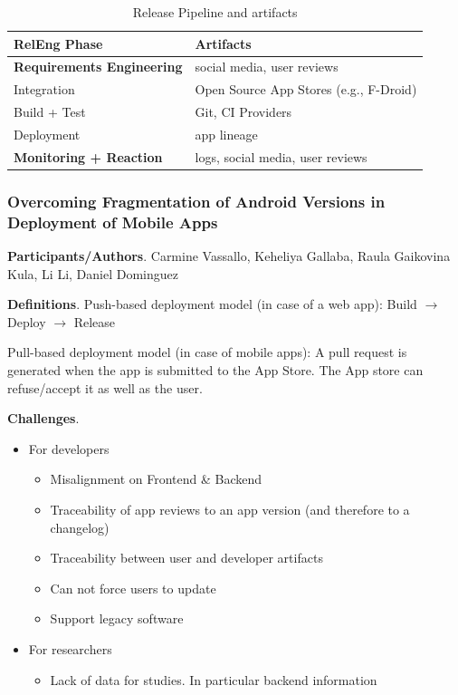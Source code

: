 \documentclass[a4paper]{article}
\newcommand{\smallsection}[1]{\noindent \textbf{#1}. }
\begin{document}
\begin{table}[h] \label{table:release}
    \centering
    \caption{Release Pipeline and artifacts}
    \begin{tabular}{l|l}
        \hline
        RelEng Phase & Artifacts \\ \hline 
        \textbf{Requirements Engineering} & social media, user         reviews \\ 
        Integration & Open Source App Stores (e.g., F-Droid) \\
        Build + Test & Git, CI Providers \\
        Deployment & app lineage \\
        \textbf{Monitoring + Reaction} & logs, social media, user
        reviews  \\ \hline
    \end{tabular}
\end{table}

\subsubsection{Overcoming Fragmentation of Android Versions in Deployment of Mobile Apps}

\smallsection{Participants/Authors} Carmine Vassallo, Keheliya Gallaba, Raula Gaikovina Kula, Li Li, Daniel Dominguez

\smallsection{Definitions} Push-based deployment model (in case of a web app): Build $\rightarrow$ Deploy $\rightarrow$ Release

Pull-based deployment model (in case of mobile apps): A pull request is generated when the app is submitted to the App Store. The App store can refuse/accept it as well as the user.

\smallsection{Challenges} 

\begin{itemize}
    \tightlist
    \item For developers
        \begin{itemize}
            \tightlist
            \item Misalignment on Frontend \& Backend
            \item Traceability of app reviews to an app version (and therefore to a changelog)
            \item Traceability between user and developer artifacts
            \item Can not force users to update
            \item Support legacy software
        \end{itemize}
    \item For researchers
        \begin{itemize}
            \tightlist
            \item Lack of data for studies. In particular backend information
        \end{itemize}
\end{itemize}
\end{document}
